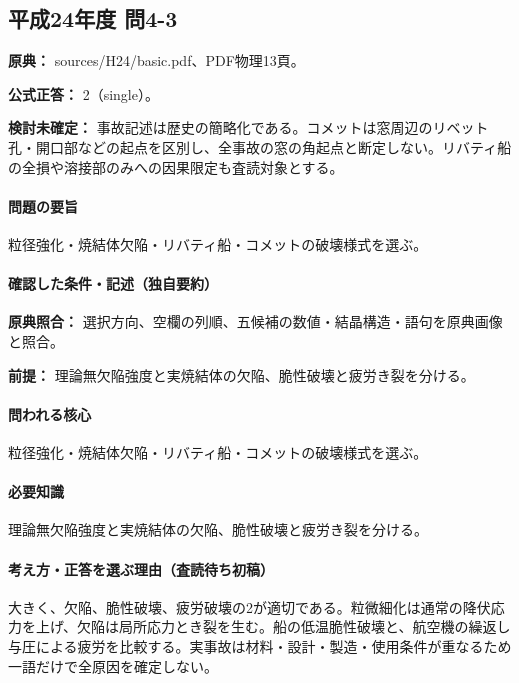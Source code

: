 \subsection{平成24年度 問4-3}
\label{q:h24-reg-basic-4-3}

\noindent\textbf{原典：} sources/H24/basic.pdf、PDF物理13頁。

\textbf{公式正答：} 2（single）。

\par\textbf{検討未確定：} 事故記述は歴史の簡略化である。コメットは窓周辺のリベット孔・開口部などの起点を区別し、全事故の窓の角起点と断定しない。リバティ船の全損や溶接部のみへの因果限定も査読対象とする。

\paragraph{問題の要旨} 粒径強化・焼結体欠陥・リバティ船・コメットの破壊様式を選ぶ。

\paragraph{確認した条件・記述（独自要約）}\mbox{}\par

\noindent\textbf{原典照合：} 選択方向、空欄の列順、五候補の数値・結晶構造・語句を原典画像と照合。\par

\noindent\textbf{前提：} 理論無欠陥強度と実焼結体の欠陥、脆性破壊と疲労き裂を分ける。\par

\paragraph{問われる核心} 粒径強化・焼結体欠陥・リバティ船・コメットの破壊様式を選ぶ。

\paragraph{必要知識} 理論無欠陥強度と実焼結体の欠陥、脆性破壊と疲労き裂を分ける。

\paragraph{考え方・正答を選ぶ理由（査読待ち初稿）} 大きく、欠陥、脆性破壊、疲労破壊の2が適切である。粒微細化は通常の降伏応力を上げ、欠陥は局所応力とき裂を生む。船の低温脆性破壊と、航空機の繰返し与圧による疲労を比較する。実事故は材料・設計・製造・使用条件が重なるため一語だけで全原因を確定しない。

